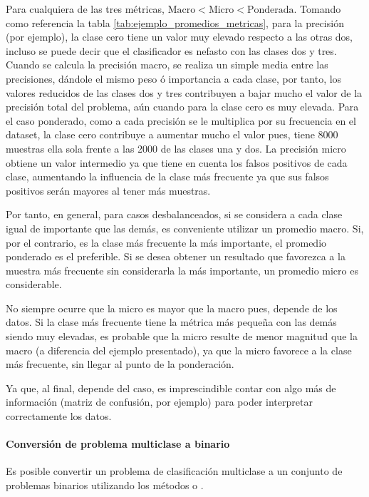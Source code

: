 Para cualquiera de las tres métricas, $\mbox{Macro} < \mbox{Micro} < \mbox{Ponderada}$. Tomando como referencia la tabla \ref{tab:ejemplo_promedios_metricas}, para la precisión (por ejemplo), la clase cero tiene un valor muy elevado respecto a las otras dos, incluso se puede decir que el clasificador es nefasto con las clases dos y tres. Cuando se calcula la precisión macro, se realiza un simple media entre las precisiones, dándole el mismo peso ó importancia a cada clase, por tanto, los valores reducidos de las clases dos y tres contribuyen a bajar mucho el valor de la precisión total del problema, aún cuando para la clase cero es muy elevada. Para el caso ponderado, como a cada precisión se le multiplica por su frecuencia en el dataset, la clase cero contribuye a aumentar mucho el valor pues, tiene 8000 muestras ella sola frente a las 2000 de las clases una y dos. La precisión micro obtiene un valor intermedio ya que tiene en cuenta los falsos positivos de cada clase, aumentando la influencia de la clase más frecuente ya que sus falsos positivos serán mayores al tener más muestras.

Por tanto, en general, para casos desbalanceados, si se considera a cada clase igual de importante que las demás, es conveniente utilizar un promedio macro. Si, por el contrario, es la clase más frecuente la más importante, el promedio ponderado es el preferible. Si se desea obtener un resultado que favorezca a la muestra más frecuente sin considerarla la más importante, un promedio micro es considerable.

No siempre ocurre que la micro es mayor que la macro pues, depende de los datos. Si la clase más frecuente tiene la métrica más pequeña con las demás siendo muy elevadas, es probable que la micro resulte de menor magnitud que la macro (a diferencia del ejemplo presentado), ya que la micro favorece a la clase más frecuente, sin llegar al punto de la ponderación.

Ya que, al final, depende del caso, es imprescindible contar con algo más de información (matriz de confusión, por ejemplo) para poder interpretar correctamente los datos.

\paragraph{Conversión de problema multiclase a binario}\label{par:convertir_matriz_binario_multiclase} Es posible convertir un problema de clasificación multiclase a un conjunto de problemas binarios utilizando los métodos  o .

